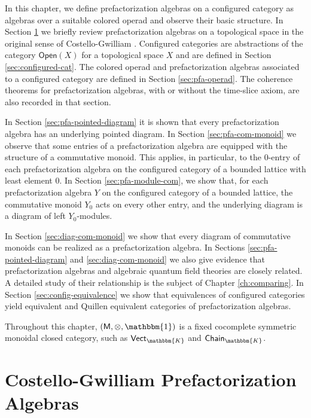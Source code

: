 \documentclass{amsbook}
\numberwithin{section}{chapter}
\numberwithin{subsection}{section}
\numberwithin{equation}{section}
\theoremstyle{plain}
\theoremstyle{definition}
\newcommand{\fieldk}{\mathbbm{K}}
\newcommand{\M}{\mathsf{M}}
\newcommand{\tensorunit}{\mathbbm{1}}
\newcommand{\Chaink}{\mathsf{Chain}_{\fieldk}}
\newcommand{\Open}{\mathsf{Open}}
\newcommand{\Openx}{\Open(X)}
\newcommand{\Vectk}{\mathsf{Vect}_{\fieldk}}
\begin{document}
In this chapter, we define prefactorization algebras on a configured category as algebras over a suitable colored operad and observe their basic structure.  In Section \ref{sec:costello} we briefly review prefactorization algebras on a topological space in the original sense of Costello-Gwilliam \cite{cg}.  Configured categories are abstractions of the category $\Openx$ for a topological space $X$ and are defined in Section \ref{sec:configured-cat}.  The colored operad and prefactorization algebras associated to a configured category are defined in Section \ref{sec:pfa-operad}.  The coherence theorems for prefactorization algebras, with or without the time-slice axiom, are also recorded in that section.

In Section \ref{sec:pfa-pointed-diagram} it is shown that every prefactorization algebra has an underlying pointed diagram.  In Section \ref{sec:pfa-com-monoid} we observe that some entries of a prefactorization algebra are equipped with the structure of a commutative monoid.  This applies, in particular, to the $0$-entry of each prefactorization algebra on the configured category of a bounded lattice with least element $0$.  In Section \ref{sec:pfa-module-com}, we show that, for each prefactorization algebra $Y$ on the configured category of a bounded lattice, the commutative monoid $Y_0$ acts on every other entry, and the underlying diagram is a diagram of left $Y_0$-modules.

In Section \ref{sec:diag-com-monoid} we show that every diagram of commutative monoids can be realized as a prefactorization algebra.  In Sections \ref{sec:pfa-pointed-diagram} and \ref{sec:diag-com-monoid} we also give evidence that prefactorization algebras and algebraic quantum field theories are closely related.  A detailed study of their relationship is the subject of Chapter \ref{ch:comparing}.  In Section \ref{sec:config-equivalence} we show that equivalences of configured categories yield equivalent and Quillen equivalent categories of prefactorization algebras.

Throughout this chapter, $(\M,\otimes,\tensorunit)$ is a fixed cocomplete symmetric monoidal closed category, such as $\Vectk$ and $\Chaink$.


\section{Costello-Gwilliam Prefactorization Algebras}\label{sec:costello}
\end{document}
